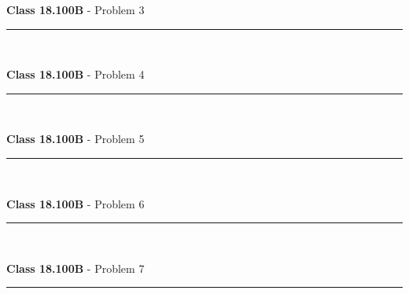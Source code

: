 \documentclass[11pt,reqno]{article}
\begin{document}
\vspace{15pt}
\begin{flushleft} 
\textbf{Class 18.100B} - Problem 3\\
\rule{500pt}{1pt}\\
\end{flushleft} 

\vspace{15pt}
\begin{flushleft} 
\textbf{Class 18.100B} - Problem 4\\
\rule{500pt}{1pt}\\
\end{flushleft} 

\vspace{15pt}
\begin{flushleft} 
\textbf{Class 18.100B} - Problem 5\\
\rule{500pt}{1pt}\\
\end{flushleft} 

\vspace{15pt}
\begin{flushleft} 
\textbf{Class 18.100B} - Problem 6\\
\rule{500pt}{1pt}\\
\end{flushleft} 


\vspace{15pt}
\begin{flushleft} 
\textbf{Class 18.100B} - Problem 7\\
\rule{500pt}{1pt}\\
\end{flushleft} 
\end{document}
